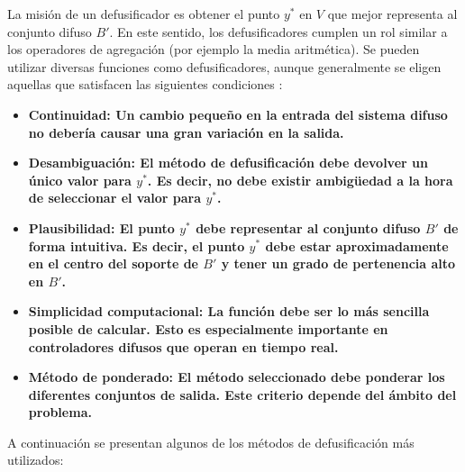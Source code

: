 La misión de un defusificador es obtener el punto $y^*$ en $V$ que mejor representa al conjunto difuso $B'$. En este sentido, los defusificadores cumplen un rol similar a los operadores de agregación (por ejemplo la media aritmética). Se pueden utilizar diversas funciones como defusificadores, aunque generalmente se eligen aquellas que satisfacen las siguientes condiciones \cite{hellendoorn93}:

\begin{itemize}
\item\bfseries Continuidad: \normalfont Un cambio pequeño en la entrada del sistema difuso no debería causar una gran variación en la salida.
\item\bfseries Desambiguación: \normalfont El método de defusificación debe devolver un único valor para $y^*$. Es decir, no debe existir ambigüedad a la hora de seleccionar el valor para $y^*$.
\item\bfseries Plausibilidad: \normalfont El punto $y^*$ debe representar al conjunto difuso $B'$ de forma intuitiva. Es decir, el punto $y^*$ debe estar aproximadamente en el centro del soporte de $B'$ y tener un grado de pertenencia alto en $B'$.
\item\bfseries Simplicidad computacional: \normalfont La función debe ser lo más sencilla posible de calcular. Esto es especialmente importante en controladores difusos que operan en tiempo real.
\item\bfseries Método de ponderado: \normalfont El método seleccionado debe ponderar los diferentes conjuntos de salida. Este criterio depende del ámbito del problema.
\end{itemize}
A continuación se presentan algunos de los métodos de defusificación más utilizados:

